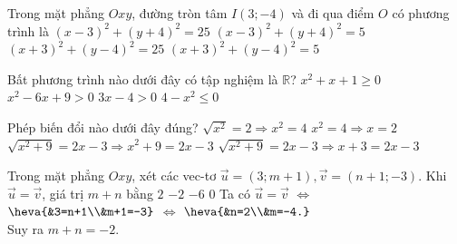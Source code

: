 \begin{ex}%
	Trong mặt phẳng $Oxy$, đường tròn tâm $I(3;-4)$ và đi qua điểm $O$ có phương trình là
	\choice
	{\True $(x-3)^2+(y+4)^2=25$}
	{$(x-3)^2+(y+4)^2=5$}
	{$(x+3)^2+(y-4)^2=25$}
	{$(x+3)^2+(y-4)^2=5$}
	
\end{ex}
\begin{ex}%
	Bất phương trình nào dưới đây có tập nghiệm là $\mathbb{R}$?
	\choice
	{\True$x^2+x+1\geq 0$}
	{$x^2-6x+9>0$}
	{$3x-4>0$}
	{$4-x^2\leq 0$}
\end{ex}
\begin{ex}%
	Phép biến đổi nào dưới đây đúng?
	\choice
	{\True$\sqrt{x^2}=2\Rightarrow x^2=4$}
	{$x^2=4\Rightarrow x=2$}
	{$\sqrt{x^2+9}=2x-3\Rightarrow x^2+9=2x-3$}
	{$\sqrt{x^2+9}=2x-3\Rightarrow x+3=2x-3$}
\end{ex}
\begin{ex}%
	Trong mặt phẳng $Oxy$, xét các vec-tơ $\overrightarrow{u}=(3;m+1), \overrightarrow{v}=(n+1;-3)$. Khi $\overrightarrow{u}=\overrightarrow{v}$, giá trị $m+n$ bằng
	\choice
	{$2$}
	{\True $-2$}
	{$-6$}
	{$0$}
	\loigiai
	{
		Ta có $\overrightarrow {u}=\overrightarrow{v}$ 
		$\Leftrightarrow$
		$\heva{&3=n+1\\&m+1=-3}$
		$\Leftrightarrow$
		$\heva{&n=2\\&m=-4.}$\\
		Suy ra $m+n=-2$.
	}
\end{ex}
